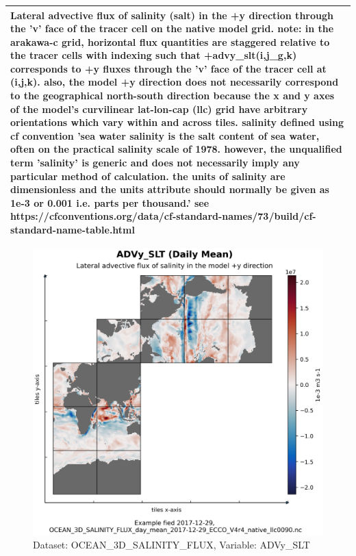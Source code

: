 \begin{longtable}{|m{}|m{}|m{}|m{}|}
\multicolumn{4}{|p{1\textwidth}|}{Lateral advective flux of salinity (salt) in the +y direction through the 'v' face of the tracer cell on the native model grid. note: in the arakawa-c grid, horizontal flux quantities are staggered relative to the tracer cells with indexing such that +advy\_slt(i,j\_g,k) corresponds to +y fluxes through the 'v' face of the tracer cell at (i,j,k). also, the model +y direction does not necessarily correspond to the geographical north-south direction because the x and y axes of the model's curvilinear lat-lon-cap (llc) grid have arbitrary orientations which vary within and across tiles. salinity defined using cf convention 'sea water salinity is the salt content of sea water, often on the practical salinity scale of 1978. however, the unqualified term 'salinity' is generic and does not necessarily imply any particular method of calculation. the units of salinity are dimensionless and the units attribute should normally be given as 1e-3 or 0.001 i.e. parts per thousand.' see https://cfconventions.org/data/cf-standard-names/73/build/cf-standard-name-table.html} \\ \hline
\end{longtable}

\begin{figure}[H]
\centering
\includegraphics[scale=0.55]{../images/plots/native_plots/Ocean_Three-Dimensional_Salinity_Fluxes/ADVy_SLT.png}
\caption{Dataset: OCEAN\_3D\_SALINITY\_FLUX, Variable: ADVy\_SLT}
\label{tab:table-OCEAN_3D_SALINITY_FLUX_ADVy_SLT-Plot}
\end{figure}
\pagebreak
